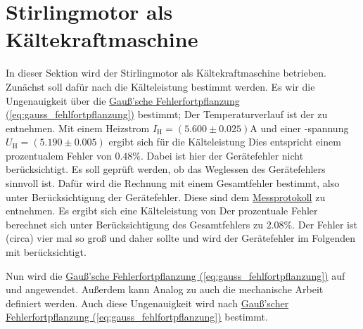 \newpage

\section{Stirlingmotor als Kältekraftmaschine}
\label{sec:A1}
In dieser Sektion wird der Stirlingmotor als Kältekraftmaschine betrieben. Zunächst soll dafür nach  die Kälteleistung bestimmt werden. Es wir die Ungenauigkeit über die \hyperref[eq:gauss_fehlfortpflanzung]{Gauß'sche Fehlerfortpflanzung (\ref*{eq:gauss_fehlfortpflanzung})} bestimmt;
Der Temperaturverlauf ist der  zu entnehmen. Mit einem Heizstrom $I_\text{H} = (5.600 \pm 0.025) \mathrm{A}$ und einer -spannung $U_\text{H} = (5.190 \pm 0.005)$ ergibt sich für die Kälteleistung
Dies entspricht einem prozentualem Fehler von $0.48\%$. Dabei ist hier der Gerätefehler nicht berücksichtigt. Es soll geprüft werden, ob das Weglessen des Gerätefehlers sinnvoll ist. Dafür wird die Rechnung mit einem Gesamtfehler bestimmt, also unter Berücksichtigung der Gerätefehler. Diese sind dem \hyperref[ch:Protokoll]{Messprotokoll} zu entnehmen. Es ergibt sich eine Kälteleistung von
Der prozentuale Fehler berechnet sich unter Berücksichtigung des Gesamtfehlers zu $2.08\%$. Der Fehler ist (circa) vier mal so groß und daher sollte und wird der Gerätefehler im Folgenden mit berücksichtigt.

Nun wird die \hyperref[eq:gauss_fehlfortpflanzung]{Gauß'sche Fehlerfortpflanzung (\ref*{eq:gauss_fehlfortpflanzung})} auf  und  angewendet. Außerdem kann Analog zu  auch die mechanische Arbeit definiert werden. Auch diese Ungenauigkeit wird nach \hyperref[eq:gauss_fehlfortpflanzung]{Gauß'scher Fehlerfortpflanzung (\ref*{eq:gauss_fehlfortpflanzung})} bestimmt.

